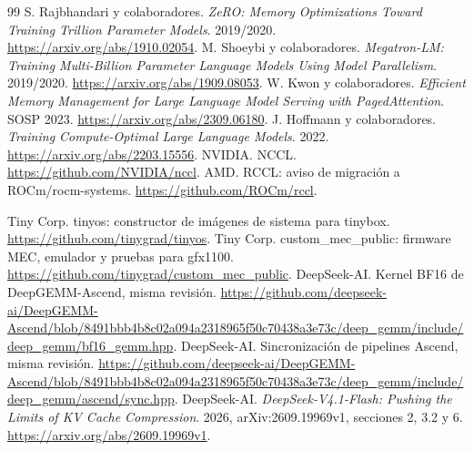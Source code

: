 \begin{thebibliography}{99}
 S. Rajbhandari y colaboradores. \emph{ZeRO: Memory Optimizations Toward Training Trillion Parameter Models}. 2019/2020. \url{https://arxiv.org/abs/1910.02054}.
 M. Shoeybi y colaboradores. \emph{Megatron-LM: Training Multi-Billion Parameter Language Models Using Model Parallelism}. 2019/2020. \url{https://arxiv.org/abs/1909.08053}.
 W. Kwon y colaboradores. \emph{Efficient Memory Management for Large Language Model Serving with PagedAttention}. SOSP 2023. \url{https://arxiv.org/abs/2309.06180}.
 J. Hoffmann y colaboradores. \emph{Training Compute-Optimal Large Language Models}. 2022. \url{https://arxiv.org/abs/2203.15556}.
 NVIDIA. NCCL. \url{https://github.com/NVIDIA/nccl}.
 AMD. RCCL: aviso de migración a ROCm/rocm-systems. \url{https://github.com/ROCm/rccl}.

 Tiny Corp. tinyos: constructor de imágenes de sistema para tinybox. \url{https://github.com/tinygrad/tinyos}.
 Tiny Corp. custom\_mec\_public: firmware MEC, emulador y pruebas para gfx1100. \url{https://github.com/tinygrad/custom_mec_public}.
 DeepSeek-AI. Kernel BF16 de DeepGEMM-Ascend, misma revisión. \url{https://github.com/deepseek-ai/DeepGEMM-Ascend/blob/8491bbb4b8c02a094a2318965f50c70438a3e73c/deep_gemm/include/deep_gemm/bf16_gemm.hpp}.
 DeepSeek-AI. Sincronización de pipelines Ascend, misma revisión. \url{https://github.com/deepseek-ai/DeepGEMM-Ascend/blob/8491bbb4b8c02a094a2318965f50c70438a3e73c/deep_gemm/include/deep_gemm/ascend/sync.hpp}.
 DeepSeek-AI. \emph{DeepSeek-V4.1-Flash: Pushing the Limits of KV Cache Compression}. 2026, arXiv:2609.19969v1, secciones 2, 3.2 y 6. \url{https://arxiv.org/abs/2609.19969v1}.
\end{thebibliography}
